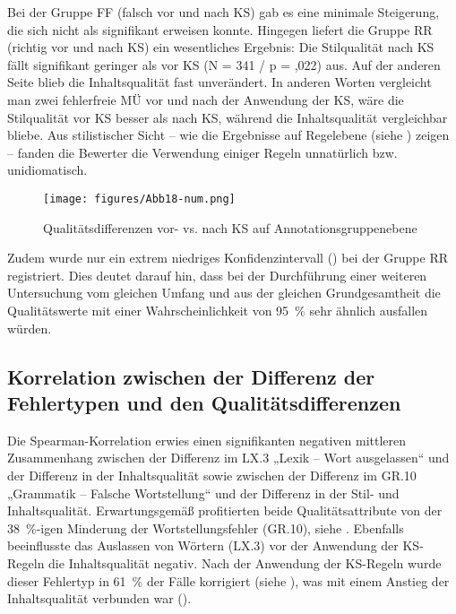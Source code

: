 Bei der Gruppe FF (falsch vor und nach KS) gab es eine minimale Steigerung, die sich nicht als signifikant erweisen konnte. Hingegen liefert die Gruppe RR (richtig vor und nach KS) ein wesentliches Ergebnis: Die Stilqualität nach KS fällt signifikant geringer als vor KS (N = 341 / p = ,022) aus. Auf der anderen Seite blieb die Inhaltsqualität fast unverändert. In anderen Worten vergleicht man zwei fehlerfreie MÜ vor und nach der Anwendung der KS, wäre die Stilqualität vor KS besser als nach KS, während die Inhaltsqualität vergleichbar bliebe. Aus stilistischer Sicht -- wie die Ergebnisse auf Regelebene (siehe ) zeigen -- fanden die Bewerter die Verwendung einiger Regeln unnatürlich bzw. unidiomatisch.


\begin{figure}
\texttt{[image: figures/Abb18-num.png]}
\caption{\label{fig:05:18} Qualitätsdifferenzen vor- vs. nach KS auf Annotationsgruppenebene  }
\end{figure}

Zudem wurde nur ein extrem niedriges Konfidenzintervall () bei der Gruppe RR registriert. Dies deutet darauf hin, dass bei der Durchführung einer weiteren Untersuchung vom gleichen Umfang und aus der gleichen Grundgesamtheit die Qualitätswerte mit einer Wahrscheinlichkeit von 95~\% sehr ähnlich ausfallen würden.

\subsection{Korrelation zwischen der Differenz der Fehlertypen und den Qualitätsdifferenzen}
\label{sec:5.2.7}
Die Spearman-Korrelation erwies einen signifikanten negativen mittleren Zusammenhang zwischen der Differenz im LX.3 „Lexik -- Wort ausgelassen“ und der Differenz in der Inhaltsqualität sowie zwischen der Differenz im GR.10 „Grammatik -- Falsche Wortstellung“ und der Differenz in der Stil- und Inhaltsqualität. Erwartungsgemäß profitierten beide Qualitätsattribute von der 38~\%-igen Minderung der Wortstellungsfehler (GR.10), siehe . Ebenfalls beeinflusste das Auslassen von Wörtern (LX.3) vor der Anwendung der KS-Regeln die Inhaltsqualität negativ. Nach der Anwendung der KS-Regeln wurde dieser Fehlertyp in 61~\% der Fälle korrigiert (siehe ), was mit einem Anstieg der Inhaltsqualität verbunden war ().


